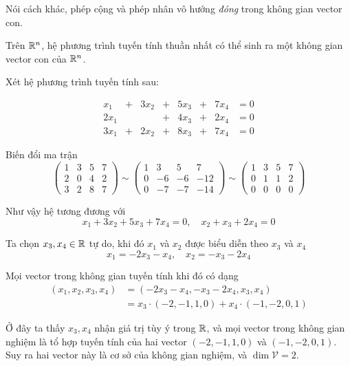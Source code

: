 Nói cách khác, phép cộng và phép nhân vô hướng \textit{đóng} trong
không gian vector con.

\begin{remark}
    Trên $\mathbb{R}^n$, hệ phương trình tuyến tính thuần nhất có thể sinh
    ra một không gian vector con của $\mathbb{R}^n$.
\end{remark}

\begin{example}
    Xét hệ phương trình tuyến tính sau:

    \begin{equation}
        \begin{array}{cccccccc}
            x_1 & + & 3x_2 & + & 5x_3 & + & 7x_4 & = 0 \\
            2x_1 & & & + & 4x_3 & + & 2x_4 & = 0 \\
            3x_1 & + & 2x_2 & + & 8x_3 & + & 7x_4 & = 0
        \end{array}
    \end{equation}

    Biến đổi ma trận
    \[
        \begin{pmatrix}
            1 & 3 & 5 & 7 \\
            2 & 0 & 4 & 2 \\
            3 & 2 & 8 & 7
        \end{pmatrix} \sim \begin{pmatrix}
            1 & 3 & 5 & 7 \\
            0 & -6 & -6 & -12 \\
            0 & -7 & -7 & -14
        \end{pmatrix} \sim \begin{pmatrix}
            1 & 3 & 5 & 7 \\
            0 & 1 & 1 & 2 \\
            0 & 0 & 0 & 0
        \end{pmatrix}
    \]

    Như vậy hệ tương đương với
    \[x_1 + 3x_2 + 5x_3 + 7x_4 = 0, \quad x_2 + x_3 + 2x_4 = 0\]

    Ta chọn $x_3, x_4 \in \mathbb{R}$ tự do, khi đó $x_1$ và $x_2$ được 
    biểu diễn theo $x_3$ và $x_4$ 
    \begin{equation}
        x_1 = -2x_3 - x_4, \quad x_2 = -x_3 - 2x_4
    \end{equation}

    Mọi vector trong không gian tuyến tính khi đó có dạng
    \begin{align*}
        (x_1, x_2, x_3, x_4) & = (-2x_3 - x_4, -x_3 - 2x_4, x_3, x_4)
        \\ & = x_3 \cdot (-2, -1, 1, 0) + x_4 \cdot (-1, -2, 0, 1) 
    \end{align*}

    Ở đây ta thấy $x_3, x_4$ nhận giá trị tùy ý trong $\mathbb{R}$, và
    mọi vector trong không gian nghiệm là tổ hợp tuyến tính của
    hai vector $(-2, -1, 1, 0)$ và $(-1, -2, 0, 1)$. Suy ra hai vector
    này là cơ sở của không gian nghiệm, và $\dim \mathcal{V} = 2$.

\end{example}

